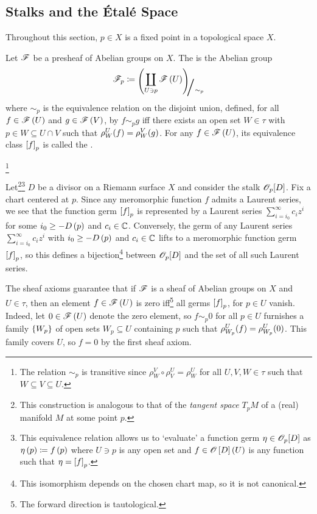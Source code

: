 \documentclass[../Moduli_Spaces_of_Riemann_Surfaces.tex]{subfiles}
\begin{document}
    \subsection{Stalks and the Étalé Space}
    Throughout this section, $p\in X$ is a fixed point in a topological space $X$.
    \begin{definition}\label{2.2:def:stalk}
        Let $\mathscr{F}$ be a presheaf of Abelian groups on $X$. The  is the Abelian group
        \begin{equation*}
            \ms{F}_p\coloneqq\raisebox{-2pt}{$\Biggl(\!$}\coprod_{U\ni p}\ms{F}\l(U\r)\!\raisebox{-2pt}{$\Biggr)$}\!\!_{\scalebox{2}{/}\sim_p}
        \end{equation*}
        where $\sim_p$ is the equivalence relation on the disjoint union, defined, for all $f\in\mathscr{F}\left(U\right)$ and $g\in\mathscr{F}\left(V\right)$, by $f\sim_p g$ iff there exists an open set $W\in\tau$ with $p\in W\subseteq U\cap V$ such that $\rho^U_W\!\left(f\right)=\rho^V_W\!\left(g\right)$. For any $f\in\mathscr{F}\left(U\right)$, its equivalence class $\left[f\right]_p$ is called the .
    \end{definition}
    \footnote{The relation $\sim_p$ is transitive since $\rho^V_W\circ\rho^U_V=\rho^U_W$ for all $U,V,W\in\tau$ such that $W\subseteq V\subseteq U$.}
    \vspace{-0.05in}
    \begin{example}
        Let\footnote{This construction is analogous to that of the \textit{tangent space} $T_pM$ of a (real) manifold $M$ at some point $p$.}\footnote{This equivalence relation allows us to `evaluate' a function germ $\eta\in\mathscr{O}_p\!\left[D\right]$ as $\eta\left(p\right)\coloneqq f\left(p\right)$ where $U\ni p$ is any open set and $f\in\mathscr{O}\left[D\right]\left(U\right)$ is any function such that $\eta=\left[f\right]_p$.} $D$ be a divisor on a Riemann surface $X$ and consider the stalk $\mathscr{O}_p\!\left[D\right]$. Fix a chart centered at $p$. Since any meromorphic function $f$ admits a Laurent series, we see that the function germ $\left[f\right]_p$ is represented by a Laurent series $\sum_{i=i_0}^{\infty}c_iz^i$ for some $i_0\geq-D\left(p\right)$ and $c_i\in\mathbb{C}$. Conversely, the germ of any Laurent series $\sum_{i=i_0}^{\infty}c_iz^i$ with $i_0\geq-D\left(p\right)$ and $c_i\in\mathbb{C}$ lifts to a meromorphic function germ $\left[f\right]_p$, so this defines a bijection\footnote{This isomorphism depends on the chosen chart map, so it is not canonical.} between $\mathscr{O}_p\!\left[D\right]$ and the set of all such Laurent series.\exqed
    \end{example}
    \begin{remark}
        The sheaf axioms guarantee that if $\mathscr{F}$ is a sheaf of Abelian groups on $X$ and $U\in\tau$, then an element $f\in\mathscr{F}\left(U\right)$ is zero iff\footnote{The forward direction is tautological.} all germs $\left[f\right]_p$, for $p\in U$ vanish. Indeed, let $0\in\mathscr{F}\left(U\right)$ denote the zero element, so $f\sim_p0$ for all $p\in U$ furnishes a family $\left\{W_p\right\}$ of open sets $W_p\subseteq U$ containing $p$ such that $\rho^U_{W_p}\!\left(f\right)=\rho^U_{W_p}\!\left(0\right)$. This family covers $U$, so $f=0$ by the first sheaf axiom.\exqed
    \end{remark}
\end{document}
